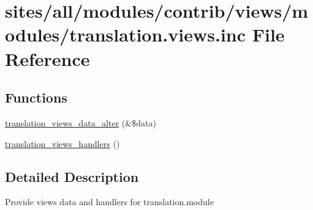 \hypertarget{translation_8views_8inc}{
\section{sites/all/modules/contrib/views/modules/translation.views.inc File Reference}
\label{translation_8views_8inc}
}
\subsection*{Functions}
\begin{CompactItemize}
\item 
\hyperlink{group__views__translation__module_gf5cdf5632190e288ac0d9518db433711}{translation\_\-views\_\-data\_\-alter} (\&\$data)
\item 
\hyperlink{group__views__translation__module_g4e32eaff4e1c53238abae68535407583}{translation\_\-views\_\-handlers} ()
\end{CompactItemize}


\subsection{Detailed Description}
Provide views data and handlers for translation.module 